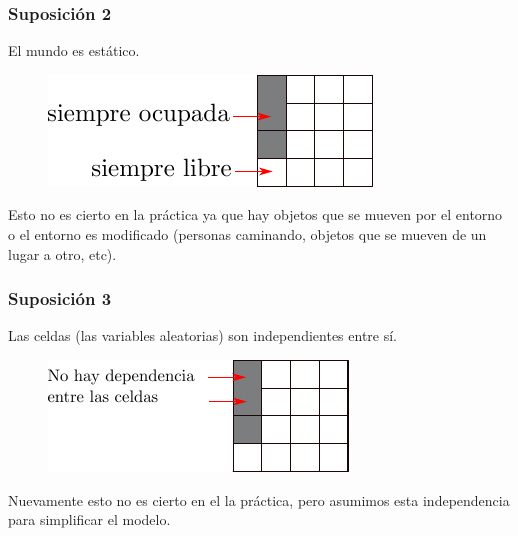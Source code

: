 \begin{frame}
    \frametitle{Suposición 2}
    El mundo es estático.
    
     	\begin{figure}[!h]
    	\includegraphics[width=0.7\columnwidth]{./images/grid_map_static_assumption.pdf}
    \end{figure}
    
    Esto no es cierto en la práctica ya que hay objetos que se mueven por el entorno o el entorno es modificado (personas caminando, objetos que se mueven de un lugar a otro, etc).
    
\end{frame}

\begin{frame}
	\frametitle{Suposición 3}
	Las celdas (las variables aleatorias) son independientes entre sí.
	
	\begin{figure}[!h]
		\includegraphics[width=0.7\columnwidth]{./images/grid_map_independency_assumption.pdf}
	\end{figure}
	
	Nuevamente esto no es cierto en el la práctica, pero asumimos esta independencia para simplificar el modelo.
	
\end{frame}


